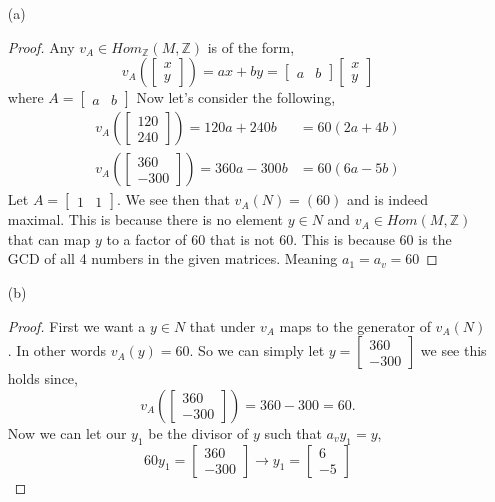 \documentclass[11pt]{article}
\newcommand{\zz}{\mathbb Z}   %
\begin{document}
\begin{itemize}
  \item[(a)]
  \begin{proof}
    Any $v_A\in Hom_\zz(M,\zz)$ is of the form,
    \[v_A\left(\begin{bmatrix}
      x \\ y
    \end{bmatrix}\right) = ax + by = \begin{bmatrix}
      a & b
    \end{bmatrix} \begin{bmatrix}
      x \\ y
    \end{bmatrix}\]
    where $A = \begin{bmatrix}
      a & b
    \end{bmatrix}$
    Now let's consider the following,
    \begin{align*}
      v_A\left(\begin{bmatrix}
        120 \\ 240
      \end{bmatrix}\right) = 120a + 240b &= 60(2a + 4b) \\
      v_A\left(\begin{bmatrix}
        360 \\ -300
      \end{bmatrix}\right) = 360a -300b &= 60(6a-5b)
    \end{align*}
    Let $A = \begin{bmatrix}
      1 & 1
    \end{bmatrix}$. We see then that $v_A(N) = (60)$ and is indeed maximal. This is because there is no element $y\in N$ and $v_A\in Hom(M,\zz)$ that can map $y$ to a factor of 60 that is not 60. This is because 60 is the GCD of all 4 numbers in the given matrices. Meaning $a_1 = a_v = 60$ 
  \end{proof} 
  \item[(b)]
  \begin{proof}
    First we want a $y \in N$ that under $v_A$ maps to the generator of $v_A(N)$. In other words $v_A(y) = 60$. So we can simply let $y = \begin{bmatrix}
      360 \\ -300
    \end{bmatrix}$ we see this holds since,
    \[v_A\left(\begin{bmatrix}
      360 \\ -300
    \end{bmatrix}\right) = 360 - 300 = 60.\] Now we can let our $y_1$ be the divisor of $y$ such that $a_vy_1 = y$,
    \[60y_1 = \begin{bmatrix}
      360 \\ -300
    \end{bmatrix} \rightarrow y_1 = \begin{bmatrix}
      6 \\ -5
    \end{bmatrix} \]    


\end{proof}
\end{itemize}
\end{document}
